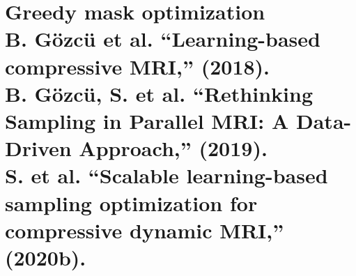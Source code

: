 
\section{Greedy mask optimization\\[-3mm]{\footnotesize B. G\"ozc\"u et al. ``Learning-based compressive MRI,'' (2018).\\[-6mm] B. G\"ozc\"u, S. et al. ``Rethinking Sampling in Parallel MRI: A Data-Driven Approach,'' (2019).\\[-6mm] S. et al. ``Scalable learning-based sampling optimization for compressive dynamic MRI,''\\[-6mm] (2020b).}}

